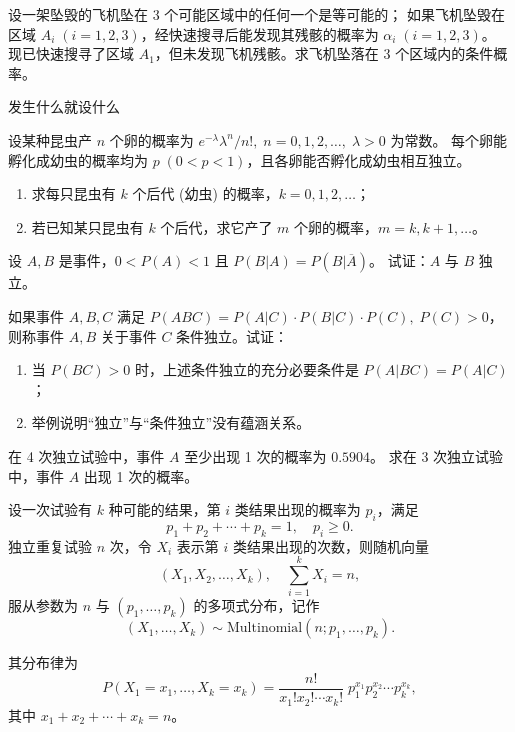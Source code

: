 \begin{exercise}
设一架坠毁的飞机坠在 3 个可能区域中的任何一个是等可能的；
如果飞机坠毁在区域 $A_i \;(i=1,2,3)$，经快速搜寻后能发现其残骸的概率为 $\alpha_i \;(i=1,2,3)$。
现已快速搜寻了区域 $A_1$，但未发现飞机残骸。求飞机坠落在 3 个区域内的条件概率。
\end{exercise}
\begin{dxtips}
    发生什么就设什么
\end{dxtips}
\begin{exercise}
设某种昆虫产 $n$ 个卵的概率为 $e^{-\lambda}\lambda^n/n!,\; n=0,1,2,\dots,\; \lambda>0$ 为常数。
每个卵能孵化成幼虫的概率均为 $p\;(0<p<1)$，且各卵能否孵化成幼虫相互独立。
\begin{enumerate}
  \item 求每只昆虫有 $k$ 个后代 (幼虫) 的概率，$k=0,1,2,\dots$；
  \item 若已知某只昆虫有 $k$ 个后代，求它产了 $m$ 个卵的概率，$m=k,k+1,\dots$。
\end{enumerate}
\end{exercise}

\begin{exercise}
设 $A,B$ 是事件，$0<P(A)<1$ 且 $P(B|A)=P(B|\overline{A})$。
试证：$A$ 与 $B$ 独立。
\end{exercise}

\begin{exercise}
如果事件 $A,B,C$ 满足 $P(ABC)=P(A|C)\cdot P(B|C)\cdot P(C),\; P(C)>0$，
则称事件 $A,B$ 关于事件 $C$ 条件独立。试证：
\begin{enumerate}
  \item 当 $P(BC)>0$ 时，上述条件独立的充分必要条件是 $P(A|BC)=P(A|C)$；
  \item 举例说明“独立”与“条件独立”没有蕴涵关系。
\end{enumerate}
\end{exercise}

\begin{exercise}
在 4 次独立试验中，事件 $A$ 至少出现 1 次的概率为 $0.5904$。
求在 3 次独立试验中，事件 $A$ 出现 1 次的概率。
\end{exercise}
\begin{definition}[多项分布]
设一次试验有 $k$ 种可能的结果，第 $i$ 类结果出现的概率为 $p_i$，满足
\[
p_1 + p_2 + \cdots + p_k = 1, \quad p_i \geq 0.
\]
独立重复试验 $n$ 次，令 $X_i$ 表示第 $i$ 类结果出现的次数，则随机向量
\[
(X_1, X_2, \dots, X_k), \quad \sum_{i=1}^k X_i = n,
\]
服从参数为 $n$ 与 $(p_1,\dots,p_k)$ 的多项式分布，记作
\[
(X_1,\dots,X_k) \sim \mathrm{Multinomial}(n; p_1,\dots,p_k).
\]

其分布律为
\[
P(X_1=x_1, \dots, X_k=x_k)
= \frac{n!}{x_1!x_2!\cdots x_k!} \; p_1^{x_1} p_2^{x_2}\cdots p_k^{x_k},
\]
其中 $x_1+x_2+\cdots+x_k = n$。
\end{definition}

